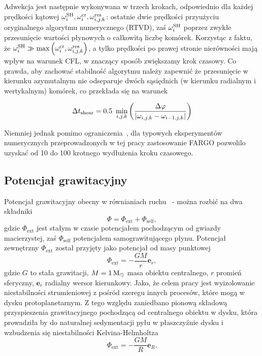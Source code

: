 Adwekcja jest następnie wykonywana w trzech krokach, odpowiednio dla każdej
prędkości kątowej $\omega_i^{\rm SH}, \omega_i^{\rm cr}, \omega_{i,j,k}^{\rm
res}$: ostatnie dwie prędkości przyużyciu oryginalnego algorytmu numerycznego
(RTVD), zaś $\omega_i^{\rm SH}$ poprzez zwykłe przesunięcie wartości płynowych o
całkowitą liczbę komórek. Korzystąc z faktu, że $\omega_i^{\rm SH} \gg
\max\left(\omega_i^{\rm cr}, \omega_{i,j,k}^{\rm res}\right)$, a tylko prędkości
po prawej stronie nierówności mają wpływ na warunek CFL, w znaczący sposób
zwiększamy krok czasowy. Co prawda, aby zachować stabilność algorytmu należy
zapewnić że przesunięcie w kierunku azymutalnym nie odseparuje dwóch sąsiędnich
(w kierunku radialnym i wertykalnym) komórek, co przekłada się na warunek

\begin{equation}\label{eq:tshear}
   \Delta t_{\rm shear} = 0.5 ~ \min_{i,j,k} \left( \frac{\Delta\varphi}
   {|\omega_{i,j,k} - \omega_{i-1,j,k}|} \right)
\end{equation}

Niemniej jednak pomimo ograniczenia~, dla typowych eksperymentów
numerycznych przeprowadzonych w tej pracy zastosowanie FARGO pozwolilo uzyskać
od 10 do 100 krotnego wydłużenia kroku czasowego.


\subsection{Potencjał grawitacyjny}
Potencjał grawitacyjny obecny w równianiach ruchu~ -  można
rozbić na dwa składniki
\begin{equation}
   \Phi = \Phi_{\textrm{ext}} + \Phi_{\textrm{self}},
\end{equation}
gdzie $\Phi_{\textrm{ext}}$ jest stałym w czasie potencjałem pochodzącym od
gwiazdy macierzystej, zaś $\Phi_{\textrm{self}}$ potencjałem samograwitującego
płynu. Potencjał zewnętrzny $\Phi_{\textrm{ext}}$ został przyjęty jako potencjał
od masy punktowej
\begin{equation}
   \Phi_{\textrm{ext}} = -\frac{GM}{r} \mathbf{e}_r,
\end{equation}
gdzie $G$ to stała grawitacji, $M = 1\hbox{$\mathrm{\thinspace M_{\odot}}$}$ masa obiektu centralnego, $r$
promień sferyczny, $\mathbf{e}_r$ radialny wersor kierunkowy.
Jako, że celem pracy jest wyizolowanie niestabilności strumieniowej z pośród
szeregu innych procesów, które mogą w dysku protoplanetarnym. Z tego względu
zaniedbano pionową składową przyspieszenia grawitacyjnego pochodzącą od
centralnego obiektu w dysku, która prowadziła by do naturalnej sedymentacji pyłu
w płaszczyźnie dysku i wzbudzenia się niestabilności
Kelvina-Helmholtza~\cite{JHK06}
\begin{equation}
   \Phi_{\textrm{ext}} = -\frac{GM}{R} \mathbf{e}_R.
\end{equation}


